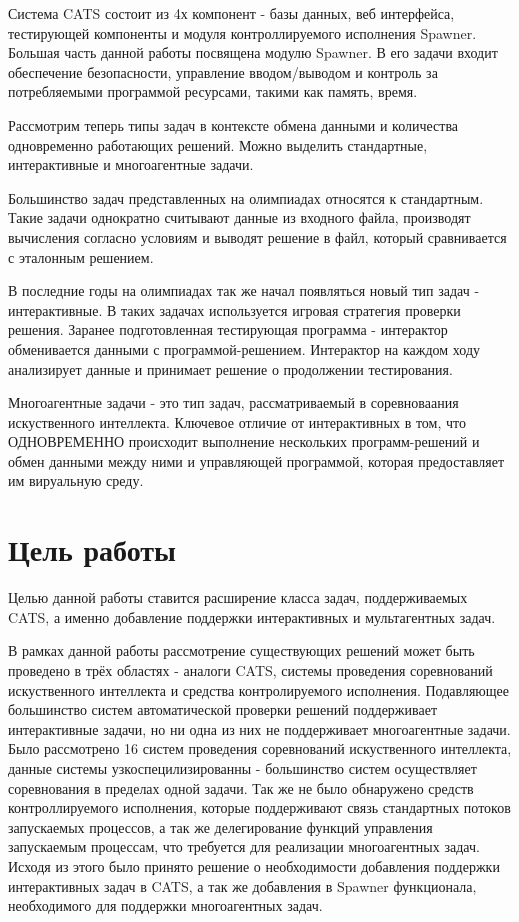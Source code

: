 \documentclass[a4paper,14pt]{extarticle}
\begin{document}
Система CATS состоит из 4х компонент - базы данных, веб интерфейса, тестирующей компоненты и модуля контроллируемого исполнения Spawner. Большая часть данной работы посвящена модулю Spawner. В его задачи входит обеспечение безопасности, управление вводом/выводом и контроль за потребляемыми программой ресурсами, такими как память, время.

Рассмотрим теперь типы задач в контексте обмена данными и количества одновременно работающих решений. Можно выделить стандартные, интерактивные и многоагентные задачи.

Большинство задач представленных на олимпиадах относятся к стандартным. Такие задачи однократно считывают данные из входного файла, производят вычисления согласно условиям и выводят решение в файл, который сравнивается с эталонным решением.

В последние годы на олимпиадах так же начал появляться новый тип задач - интерактивные. В таких задачах используется игровая стратегия проверки решения. Заранее подготовленная тестирующая программа - интерактор обменивается данными с программой-решением. Интерактор на каждом ходу анализирует данные и принимает решение о продолжении тестирования.

Многоагентные задачи - это тип задач, рассматриваемый в соревноваания искуственного интеллекта. Ключевое отличие от интерактивных в том, что ОДНОВРЕМЕННО происходит выполнение нескольких программ-решений и обмен данными между ними и управляющей программой, которая предоставляет им вируальную среду.

\section{Цель работы}

Целью данной работы ставится расширение класса задач, поддерживаемых CATS, а именно добавление поддержки интерактивных и мультагентных задач.

В рамках данной работы рассмотрение существующих решений может быть проведено в трёх областях - аналоги CATS, системы проведения соревнований искуственного интеллекта и средства контролируемого исполнения. Подавляющее большинство систем автоматической проверки решений поддерживает интерактивные задачи, но ни одна из них не поддерживает многоагентные задачи. Было рассмотрено 16 систем проведения соревнований искуственного интеллекта, данные системы узкоспецилизированны - большинство систем осуществляет соревнования в пределах одной задачи. Так же не было обнаружено средств контроллируемого исполнения, которые поддерживают связь стандартных потоков запускаемых процессов, а так же делегирование функций управления запускаемым процессам, что требуется для реализации многоагентных задач. Исходя из этого было принято решение о необходимости добавления поддержки интерактивных задач в CATS, а так же добавления в Spawner функционала, необходимого для поддержки многоагентных задач.
\end{document}
